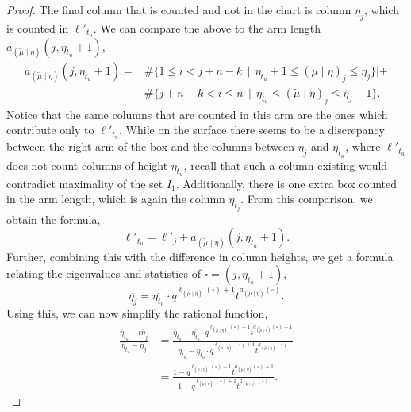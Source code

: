 \documentclass[ALCO]{cedram}
\newcommand{\mutilde}{{\widetilde{\mu}}}
\newcommand{\mutildeeta}{{(\mutilde \mid \eta)}}
\newcommand{\leg}[1]{{\ell_{#1}(\square)}}
\newcommand{\armtwo}[1]{{a_{#1}(\square)}}
\newcommand{\ltm}{\ell'_{t_u}}
\newcommand{\lj}{\ell'_j}
\begin{document}
\begin{proof}
The final column that is counted and not in the chart is column $\eta_j$, which is counted in $\ltm$. We can compare the above to the arm length $a_\mutildeeta(j,\eta_{t_u}+1)$,
\begin{align*} a_\mutildeeta(j,\eta_{t_u}+1) =  &\#\{1 \leq i < j+n-k \, \mid \, \eta_{t_u}+1 \leq \mutildeeta_j \leq \eta_j  \}| +\\
& \# \{ j+n-k <  i \leq n \, \mid \, \eta_{t_u} \leq \mutildeeta_j \leq \eta_j-1 \}. \end{align*}
Notice that the same columns that are counted in this arm are the ones which contribute only to $\ltm$. While on the surface there seems to be a discrepancy between the right arm of the box and the columns between $\eta_j$ and $\eta_{t_u}$, where $\ltm$ does not count columns of height $\eta_{t_u}$, recall that such a column existing would contradict maximality of the set $I_1$. Additionally, there is one extra box counted in the arm length, which is again the column $\eta_{t_j}$. From this comparison, we obtain the formula,
\[ \ltm = \lj + a_\mutildeeta(j,\eta_{t_u}+1).\]
Further, combining this with the difference in column heights, we get a formula relating the eigenvalues and statistics of $\square = (j,\eta_{t_u}+1)$,
\[ \overline{\eta_j} = \overline{\eta_{t_u}} \cdot q^{\leg{\mutildeeta}+1} t^\armtwo{\mutildeeta}.\]
Using this, we can now simplify the rational function,
\begin{align*}
    \frac{\overline{\eta}_{t_u}-t \overline{\eta}_j}{\overline{\eta}_{t_u}-\overline{\eta}_j} &= \frac{\overline{\eta}_{t_u}-\overline{\eta_{t_u}} \cdot q^{\leg{\mutildeeta}+1} t^{\armtwo{\mutildeeta}+1}}{\overline{\eta}_{t_u}-\overline{\eta_{t_u}} \cdot q^{\leg{\mutildeeta}+1} t^\armtwo{\mutildeeta}}\\
    &= \frac{1-q^{\leg{\mutildeeta}+1} t^{\armtwo{\mutildeeta}+1}}{1-q^{\leg{\mutildeeta}+1} t^{\armtwo{\mutildeeta}}}.
\end{align*}


\end{proof}
\end{document}
